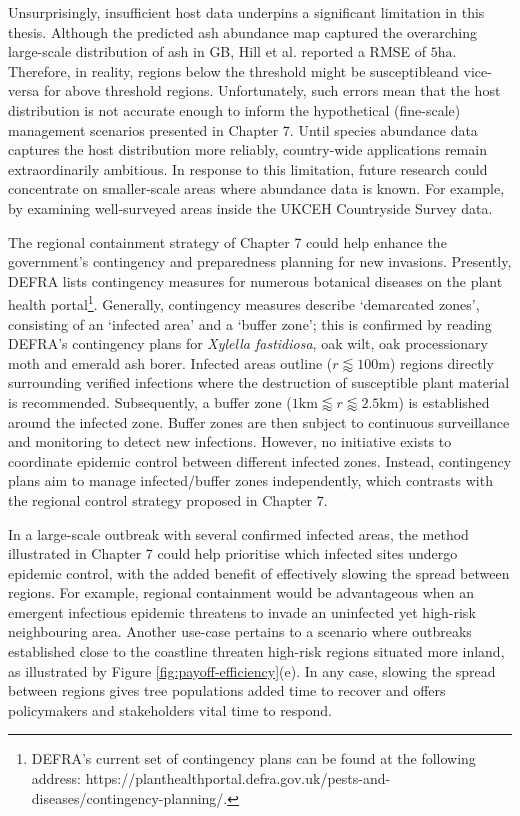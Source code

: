 Unsurprisingly, insufficient host data underpins a significant limitation in this thesis.
Although the predicted ash abundance map captured the overarching large-scale distribution of ash in GB, Hill et al. reported a RMSE of $5\mathrm{ha}$. Therefore, in reality, regions below the threshold might be susceptible\textemdash and vice-versa for above threshold regions. Unfortunately, such errors mean that the host distribution is not accurate enough to inform the hypothetical (fine-scale) management scenarios presented in Chapter 7. Until species abundance data captures the host distribution more reliably, country-wide applications remain extraordinarily ambitious. In response to this limitation, future research could concentrate on smaller-scale areas where abundance data is known. For example, by examining well-surveyed areas inside the UKCEH Countryside Survey data.

The regional containment strategy of Chapter 7 could help enhance the government's contingency and preparedness planning for new invasions. Presently, DEFRA lists contingency measures for numerous botanical diseases on the plant health portal\footnote{DEFRA's current set of contingency plans can be found at the following address: https://planthealthportal.defra.gov.uk/pests-and-diseases/contingency-planning/.}. Generally, contingency measures describe `demarcated zones', consisting of an `infected area' and a `buffer zone'; this is confirmed by reading DEFRA's contingency plans for \textit{Xylella fastidiosa}, oak wilt, oak processionary moth and emerald ash borer. Infected areas outline  ($r \lessapprox 100 \mathrm{m}$) regions directly surrounding verified infections where the destruction of susceptible plant material is recommended. Subsequently, a buffer zone ($1 \mathrm{km} \lessapprox  r \lessapprox 2.5 \mathrm{km}$) is established around the infected zone. Buffer zones are then subject to continuous surveillance and monitoring to detect new infections. However, no initiative exists to coordinate epidemic control between different infected zones. Instead, contingency plans aim to manage infected/buffer zones independently, which contrasts with the regional control strategy proposed in Chapter 7.

In a large-scale outbreak with several confirmed infected areas, the method illustrated in Chapter 7 could help prioritise which infected sites undergo epidemic control, with the added benefit of effectively slowing the spread between regions. For example, regional containment would be advantageous when an emergent infectious epidemic threatens to invade an uninfected yet high-risk neighbouring area. Another use-case pertains to a scenario where outbreaks established close to the coastline threaten high-risk regions situated more inland, as illustrated by Figure \ref{fig:payoff-efficiency}(e). In any case, slowing the spread between regions gives tree populations added time to recover and offers policymakers and stakeholders vital time to respond. 

